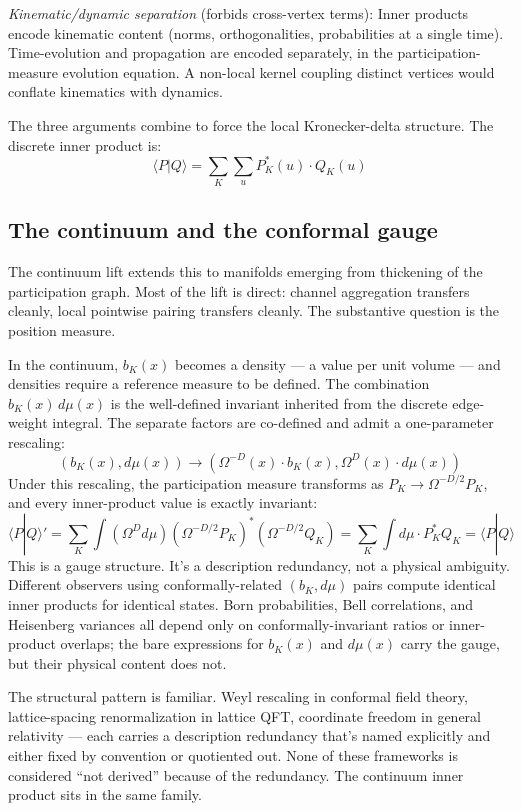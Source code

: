 \documentclass[11pt,a4paper]{article}
\begin{document}
\emph{Kinematic/dynamic separation} (forbids cross-vertex terms): Inner products encode kinematic content (norms, orthogonalities, probabilities at a single time). Time-evolution and propagation are encoded separately, in the participation-measure evolution equation. A non-local kernel coupling distinct vertices would conflate kinematics with dynamics.

The three arguments combine to force the local Kronecker-delta structure. The discrete inner product is:
\[
\langle P|Q\rangle = \sum_K \sum_u P^*_K(u) \cdot Q_K(u)
\]

\subsection{The continuum and the conformal gauge}

The continuum lift extends this to manifolds emerging from thickening of the participation graph. Most of the lift is direct: channel aggregation transfers cleanly, local pointwise pairing transfers cleanly. The substantive question is the position measure.

In the continuum, $b_K(x)$ becomes a density --- a value per unit volume --- and densities require a reference measure to be defined. The combination $b_K(x)\,d\mu(x)$ is the well-defined invariant inherited from the discrete edge-weight integral. The separate factors are co-defined and admit a one-parameter rescaling:
\[
(b_K(x), d\mu(x)) \to (\Omega^{-D}(x) \cdot b_K(x), \Omega^D(x) \cdot d\mu(x))
\]
Under this rescaling, the participation measure transforms as $P_K \to \Omega^{-D/2} P_K$, and every inner-product value is exactly invariant:
\[
\langle P|Q\rangle' = \sum_K \int (\Omega^D d\mu)(\Omega^{-D/2} P_K)^* (\Omega^{-D/2} Q_K) = \sum_K \int d\mu \cdot P^*_K Q_K = \langle P|Q\rangle
\]
This is a gauge structure. It's a description redundancy, not a physical ambiguity. Different observers using conformally-related $(b_K, d\mu)$ pairs compute identical inner products for identical states. Born probabilities, Bell correlations, and Heisenberg variances all depend only on conformally-invariant ratios or inner-product overlaps; the bare expressions for $b_K(x)$ and $d\mu(x)$ carry the gauge, but their physical content does not.

The structural pattern is familiar. Weyl rescaling in conformal field theory, lattice-spacing renormalization in lattice QFT, coordinate freedom in general relativity --- each carries a description redundancy that's named explicitly and either fixed by convention or quotiented out. None of these frameworks is considered ``not derived'' because of the redundancy. The continuum inner product sits in the same family.
\end{document}
